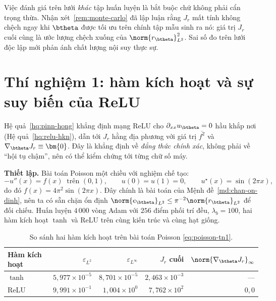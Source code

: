 Việc đánh giá trên lưới \emph{khác} tập huấn luyện là bắt buộc chứ không phải cẩn
trọng thừa. Nhận xét~\ref{rem:monte-carlo} đã lập luận rằng $J_r$ mất tính không
chệch ngay khi $\btheta$ được tối ưu trên chính tập mẫu sinh ra nó: giá trị $J_r$
cuối cùng là ước lượng chệch xuống của $\norm{r_{\btheta}}^2_{L^2}$. Sai số đo
trên lưới độc lập mới phản ánh chất lượng nội suy thực sự.
 
\section{Thí nghiệm 1: hàm kích hoạt và sự suy biến của ReLU}
\label{sec:tn1}
 
\begin{thinghiem}
\label{tn:relu}
Hệ quả~\ref{hq:pinn-hong} khẳng định mạng ReLU cho
$\partial_{xx}u_{\btheta} = 0$ hầu khắp nơi
(Hệ quả~\ref{hq:relu-hkn}), dẫn tới $J_r$ hằng địa phương với giá trị
$\overline{f^2}$ và $\nabla_{\btheta}J_r \equiv \bm{0}$. Đây là khẳng định về
\emph{đẳng thức chính xác}, không phải về ``hội tụ chậm'', nên có thể kiểm chứng
tới từng chữ số máy.
\end{thinghiem}
 
\textbf{Thiết lập.} Bài toán Poisson một chiều với nghiệm chế tạo:
\begin{equation}
-u''(x) = f(x) \ \text{ trên } (0,1),
\qquad u(0) = u(1) = 0,
\qquad u^{\star}(x) = \sin(2\pi x),
\label{eq:poisson-tn1}
\end{equation}
do đó $f(x) = 4\pi^2\sin(2\pi x)$. Đây chính là bài toán của
Mệnh đề~\ref{md:chan-on-dinh}, nên ta có sẵn chặn ổn định
$\norm{e_{\btheta}}_{L^2} \le \pi^{-2}\norm{r_{\btheta}}_{L^2}$ để đối chiếu.
Huấn luyện $4\,000$ vòng Adam với $256$ điểm phối trí đều, $\lambda_b = 100$, hai
hàm kích hoạt $\tanh$ và ReLU trên cùng kiến trúc và cùng hạt giống.
 
\begin{table}[H]
\centering
\caption{So sánh hai hàm kích hoạt trên bài toán Poisson \eqref{eq:poisson-tn1}.}
\label{tab:tn1}
\small
\begin{tabular}{@{}lrrrr@{}}
\toprule
\textbf{Hàm kích hoạt} & $\varepsilon_{L^2}$ & $\varepsilon_{L^{\infty}}$
& $J_r$ cuối & $\norm{\nabla_{\btheta}J_r}_{\infty}$ \\
\midrule
$\tanh$ & $5{,}977\times10^{-5}$ & $8{,}701\times10^{-5}$
        & $2{,}463\times10^{-3}$ & --- \\
ReLU    & $9{,}991\times10^{-1}$ & $1{,}004\times10^{0}$
        & $7{,}762\times10^{2}$  & $0{,}0$ \\
\bottomrule
\end{tabular}
\end{table}
 
